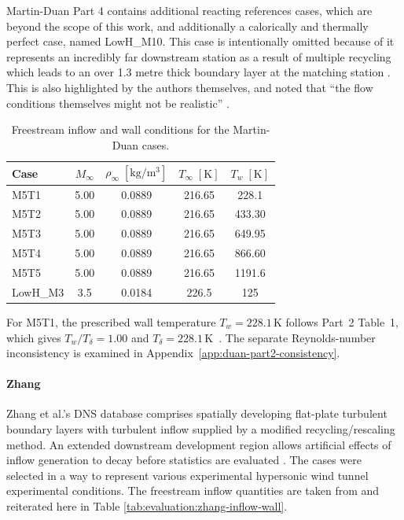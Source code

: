Martin-Duan Part 4 contains additional reacting references cases, which are beyond the scope of this work, and additionally a calorically and thermally perfect case, named LowH\_M10. This case is intentionally omitted because of it represents an incredibly far downstream station as a result of multiple recycling which leads to an over 1.3 metre thick boundary layer at the matching station \cite[Table 2]{duan2011direct_Part4}. This is also highlighted by the authors themselves, and noted that “the flow conditions themselves might not be realistic” \cite{duan2011direct_Part4}.

\begin{table}[H]
    \centering
    \caption{Freestream inflow and wall conditions for the Martin-Duan cases.}
    \label{tab:evaluation:martin-duan-inflow-wall}
    \begin{tabular}{l S[table-format=1.2] S[table-format=1.4] S[table-format=3.2] S[table-format=4.2]}
        \toprule
        Case & {\(M_\infty\)} & {\(\rho_\infty\;[\mathrm{kg}/\mathrm{m}^3]\)} & {\(T_\infty\;[\mathrm{K}]\)} & {\(T_w\;[\mathrm{K}]\)} \\
        \midrule
        M5T1 & 5.00 & 0.0889 & 216.65 & 228.1 \\
        M5T2 & 5.00 & 0.0889 & 216.65 & 433.30 \\
        M5T3 & 5.00 & 0.0889 & 216.65 & 649.95 \\
        M5T4 & 5.00 & 0.0889 & 216.65 & 866.60 \\
        M5T5 & 5.00 & 0.0889 & 216.65 & 1191.6 \\
        LowH\_M3 & 3.5 & 0.0184 & 226.5 & 125 \\
        \bottomrule
    \end{tabular}
\end{table}

For M5T1, the prescribed wall temperature \(T_w=228.1\,\mathrm{K}\) follows Part~2 Table~1, which gives \(T_w/T_\delta=1.00\) and \(T_\delta=228.1\,\mathrm{K}\)~\cite{duan2010direct_part2}. The separate Reynolds-number inconsistency is examined in Appendix~\ref{app:duan-part2-consistency}.

\paragraph*{Zhang}

Zhang et al.’s DNS database comprises spatially developing flat-plate turbulent boundary layers with turbulent inflow supplied by a modified recycling/rescaling method. An extended downstream development region allows artificial effects of inflow generation to decay before statistics are evaluated \cite{zhang2018direct}. The cases were selected in a way to represent various experimental hypersonic wind tunnel experimental conditions. The freestream inflow quantities are taken from \cite[Tbale 1]{zhang2018direct} and reiterated here in Table \ref{tab:evaluation:zhang-inflow-wall}.

